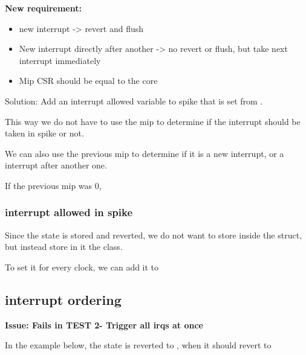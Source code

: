\textbf{New requirement:}

\begin{itemize}
    \item new interrupt -> revert and flush
    \item New interrupt directly after another -> no revert or flush, but take next interrupt immediately
    \item Mip CSR should be equal to the core
\end{itemize}

Solution: Add an interrupt allowed variable to spike that is set from .

This way we do not have to use the mip to determine if the interrupt should be taken in spike or not.

We can also use the previous mip to determine if it is a new interrupt, or a interrupt after another one.

If the previous mip was 0, 

\subsubsection{interrupt allowed in spike}

Since the state is stored and reverted, we do not want to store  inside the  struct, but instead store in it the  class. 

To set it for every clock, we can add it to 

\subsection{interrupt ordering}
\textbf{Issue: Fails in TEST 2- Trigger all irqs at once}

In the example below, the state is reverted to , when it should revert to 

